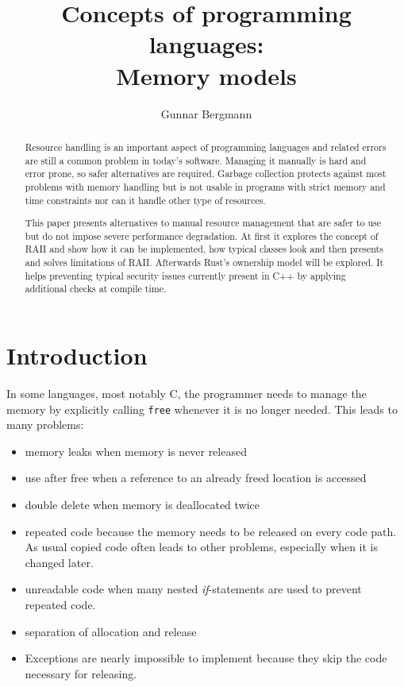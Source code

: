\documentclass[conference,twocolumn]{IEEEtran}
\begin{document}
    

\title{Concepts of programming languages: \\ Memory models}
\author{Gunnar Bergmann}


\maketitle

\begin{abstract}
Resource handling is an important aspect of programming languages and related errors are still a common problem in today's software. Managing it manually is hard and error prone, so safer alternatives are required. Garbage collection protects against most problems with memory handling but is not usable in programs with strict memory and time constraints nor can it handle other type of resources.

This paper presents alternatives to manual resource management that are safer to use but do not impose severe performance degradation. At first it explores the concept of RAII and show how it can be implemented, how typical classes look and then presents and solves limitations of RAII. Afterwards Rust's ownership model will be explored. It helps preventing typical security issues currently present in C++ by applying additional checks at compile time.

\end{abstract}


\section{Introduction}

In some languages, most notably C, the programmer needs to manage the memory by explicitly calling \verb|free| whenever it is no longer needed.
This leads to many problems:
\begin{itemize}
    \item memory leaks when memory is never released
    \item use after free when a reference to an already freed location is accessed
    \item double delete when memory is deallocated twice
    \item repeated code because the memory needs to be released on every code path. As usual copied code often leads to other problems, especially when it is changed later.
    \item unreadable code when many nested \emph{if}-statements are used to prevent repeated code.
    \item separation of allocation and release
    \item Exceptions are nearly impossible to implement because they skip the code necessary for releasing.
\end{itemize}
\end{document}
